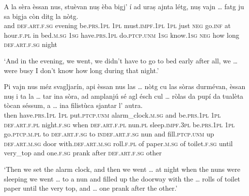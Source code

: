 \begin{linenumbers}
\gll    A la sèra èssan nus, stuèvan nuṣ èba bigj’ í ad uraṣ ajnta létg, nuṣ vajn … fatg ju sa bigja còn  ditg la nòtg.\\
and \textsc{def.art.f.sg} evening be.\textsc{prs.1pl} \textsc{1pl} must.\textsc{impf.1pl} \textsc{1pl} just \textsc{neg} go.\textsc{inf} at hour.\textsc{f.pl} in  bed.\textsc{m.sg} \textsc{1sg} have.\textsc{prs.1pl} {} do.\textsc{ptcp.unm} \textsc{1sg} know.\textsc{1sg} \textsc{neg} how long \textsc{def.art.f.sg} night\\
\end{linenumbers}
\medskip
\glt `And in the evening, we went, we didn’t have to go to bed early after all, we … were busy I don’t know how long during that night.'
\medskip

\begin{linenumbers}
\gll Pi vajn nus méz svagljarín, api èssan nus las … nòtg cu las sòras durmévan, èssan nuṣ i\footnotemark{} ta  la … tar ina sòra, ad amplanjú sé agl ésch cul … ròlas da pupí da tualèta tòcan séssum, a … ina filistùca sjantar l’ autra.\\
then have.\textsc{prs.1pl} \textsc{1pl} put.\textsc{ptcp.unm} alarm\_clock.\textsc{m.sg} and be.\textsc{prs.1pl} \textsc{1pl} \textsc{def.art.f.pl} {} night.\textsc{f.sg} when \textsc{def.art.f.pl} nun.\textsc{pl} sleep.\textsc{impf.3pl} be.\textsc{prs.1pl} \textsc{1pl} go.\textsc{ptcp.m.pl} to \textsc{def.art.f.sg} {} to \textsc{indef.art.f.sg} nun and fill.\textsc{ptcp.unm} up \textsc{def.art.m.sg} door with.\textsc{def.art.m.sg} {} roll.\textsc{f.pl} of paper.\textsc{m.sg} of toilet.\textsc{f.sg} until very\_top and {} one.\textsc{f.sg} prank after \textsc{def.art.f.sg} other\\
\end{linenumbers}
\medskip
\glt `Then we set the alarm clock, and then we went … at night when the nuns were sleeping we went … to a nun and filled up the doorway with the … rolls of toilet paper until the very top, and … one prank after the other.'
\medskip

